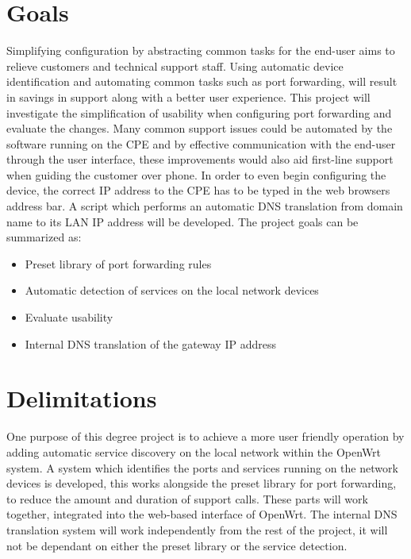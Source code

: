 \documentclass[a4paper,11pt,makeidx]{kth-bcs}
\begin{document}
\section{Goals}
Simplifying configuration by abstracting common tasks for the end-user aims to relieve customers and technical support staff.
Using automatic device identification and automating common tasks such as port forwarding, will result in savings in support along with a better user experience.
This project will investigate the simplification of usability when configuring port forwarding and evaluate the changes.
Many common support issues could be automated by the software running on the CPE and by effective communication with the end-user through the user interface, these improvements would also aid first-line support when guiding the customer over phone.
In order to even begin configuring the device, the correct IP address to the CPE has to be typed in the web browsers address bar.
A script which performs an automatic DNS translation from domain name to its LAN IP address will be developed.
The project goals can be summarized as:

\begin{itemize}
   \item Preset library of port forwarding rules
   \item Automatic detection of services on the local network devices
   \item Evaluate usability
   \item Internal DNS translation of the gateway IP address
\end{itemize}

\section{Delimitations}
One purpose of this degree project is to achieve a more user friendly operation by adding automatic service discovery on the local network within the OpenWrt system.
A system which identifies the ports and services running on the network devices is developed, this works alongside the preset library for port forwarding, to reduce the amount and duration of support calls.
These parts will work together, integrated into the web-based interface of OpenWrt.
The internal DNS translation system will work independently from the rest of the project, it will not be dependant on either the preset library or the service detection.
\end{document}
